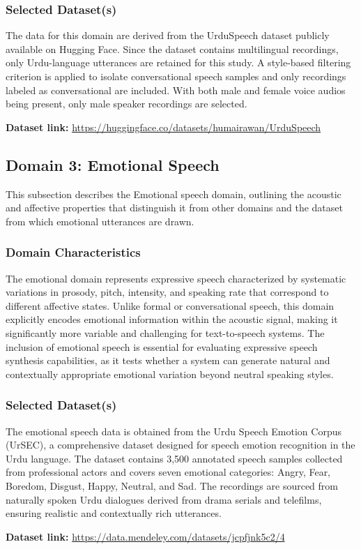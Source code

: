 \documentclass[a4paper,fleqn]{cas-dc}
\begin{document}
    \subsubsection{Selected Dataset(s)}
    \indent The data for this domain are derived from the UrduSpeech dataset publicly available on Hugging Face. Since the dataset contains multilingual recordings, only Urdu-language utterances are retained for this study. A style-based filtering criterion is applied to isolate conversational speech samples and only recordings labeled as conversational are included. With both male and female voice audios being present, only male speaker recordings are selected.
    
    \noindent \textbf{Dataset link:} \url{https://huggingface.co/datasets/humairawan/UrduSpeech}
    
    
    \subsection{Domain 3: Emotional Speech}\label{sec:domain-emotion}

    This subsection describes the Emotional speech domain, outlining the acoustic and affective properties that distinguish it from other domains and the dataset from which emotional utterances are drawn.

    \subsubsection{Domain Characteristics}
    \indent The emotional domain represents expressive speech characterized by systematic variations in prosody, pitch, intensity, and speaking rate that correspond to different affective states. Unlike formal or conversational speech, this domain explicitly encodes emotional information within the acoustic signal, making it significantly more variable and challenging for text-to-speech systems. The inclusion of emotional speech is essential for evaluating expressive speech synthesis capabilities, as it tests whether a system can generate natural and contextually appropriate emotional variation beyond neutral speaking styles.
    
    \subsubsection{Selected Dataset(s)}
    \begin{sloppypar}
    \indent The emotional speech data is obtained from the Urdu Speech Emotion Corpus (UrSEC), a comprehensive dataset designed for speech emotion recognition in the Urdu language. The dataset contains 3,500 annotated speech samples collected from professional actors and covers seven emotional categories: Angry, Fear, Boredom, Disgust, Happy, Neutral, and Sad. The recordings are sourced from naturally spoken Urdu dialogues derived from drama serials and telefilms, ensuring realistic and contextually rich utterances.
    
    \noindent \textbf{Dataset link:} \url{https://data.mendeley.com/datasets/jcpfjnk5c2/4}
    \end{sloppypar}
    
\end{document}
